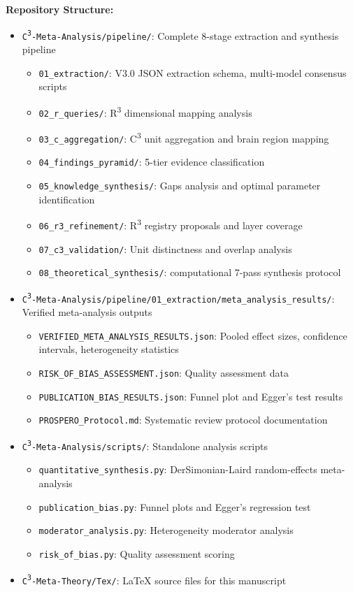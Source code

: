 \documentclass[9pt,onecolumn]{article}
\begin{document}
\textbf{Repository Structure:}
\begin{itemize}[leftmargin=*, topsep=2pt, itemsep=1pt]
\item \texttt{C\textsuperscript{3}-Meta-Analysis/pipeline/}: Complete 8-stage extraction and synthesis pipeline
  \begin{itemize}[leftmargin=*, topsep=1pt, itemsep=0.5pt]
  \item \texttt{01\_extraction/}: V3.0 JSON extraction schema, multi-model consensus scripts
  \item \texttt{02\_r\_queries/}: R\textsuperscript{3} dimensional mapping analysis
  \item \texttt{03\_c\_aggregation/}: C\textsuperscript{3} unit aggregation and brain region mapping
  \item \texttt{04\_findings\_pyramid/}: 5-tier evidence classification
  \item \texttt{05\_knowledge\_synthesis/}: Gaps analysis and optimal parameter identification
  \item \texttt{06\_r3\_refinement/}: R\textsuperscript{3} registry proposals and layer coverage
  \item \texttt{07\_c3\_validation/}: Unit distinctness and overlap analysis
  \item \texttt{08\_theoretical\_synthesis/}: computational 7-pass synthesis protocol
  \end{itemize}
\item \texttt{C\textsuperscript{3}-Meta-Analysis/pipeline/01\_extraction/meta\_analysis\_results/}: Verified meta-analysis outputs
  \begin{itemize}[leftmargin=*, topsep=1pt, itemsep=0.5pt]
  \item \texttt{VERIFIED\_META\_ANALYSIS\_RESULTS.json}: Pooled effect sizes, confidence intervals, heterogeneity statistics
  \item \texttt{RISK\_OF\_BIAS\_ASSESSMENT.json}: Quality assessment data
  \item \texttt{PUBLICATION\_BIAS\_RESULTS.json}: Funnel plot and Egger's test results
  \item \texttt{PROSPERO\_Protocol.md}: Systematic review protocol documentation
  \end{itemize}
\item \texttt{C\textsuperscript{3}-Meta-Analysis/scripts/}: Standalone analysis scripts
  \begin{itemize}[leftmargin=*, topsep=1pt, itemsep=0.5pt]
  \item \texttt{quantitative\_synthesis.py}: DerSimonian-Laird random-effects meta-analysis
  \item \texttt{publication\_bias.py}: Funnel plots and Egger's regression test
  \item \texttt{moderator\_analysis.py}: Heterogeneity moderator analysis
  \item \texttt{risk\_of\_bias.py}: Quality assessment scoring
  \end{itemize}
\item \texttt{C\textsuperscript{3}-Meta-Theory/Tex/}: LaTeX source files for this manuscript
\end{itemize}
\end{document}
